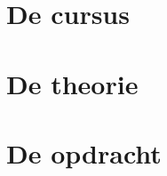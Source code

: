 \documentclass[dutch,a4paper,12pt,doubleside]{book}
\begin{document}
{\hypersetup{linkcolor=black}
\tableofcontents
}


\part{De cursus}


\part{De theorie}





\part{De opdracht}









\end{document}
